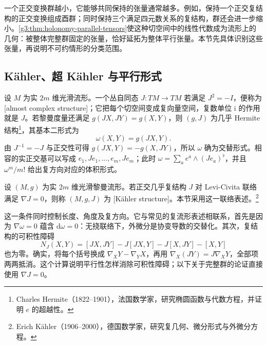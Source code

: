 
% 
% 
% 


一个正交变换群越小，它能够共同保持的张量通常越多。例如，保持一个正交复结构的正交变换组成酉群；同时保持三个满足四元数关系的复结构，群还会进一步缩小。\cref{g3:thm:holonomy-parallel-tensors}使这种切空间中的线性代数成为流形上的几何：被整体完整群固定的张量，恰好延拓为整体平行张量。本节先具体识别这些张量，再说明不可约情形的分类范围。

\subsection{Kähler、超 Kähler 与平行形式}
\label{g3:subsec:0505:01}

设 \(M\) 为实 \(2m\) 维光滑流形。一个丛自同态 \(J:TM\to TM\) 若满足 \(J^2=-I\)，便称为[almost complex structure]；它把每个切空间变成复向量空间，复数单位 \(\mathrm i\) 的作用就是 \(J\)。若黎曼度量还满足 \(g(JX,JY)=g(X,Y)\)，则 \((g,J)\) 为几乎 Hermite 结构\footnote{Charles Hermite（1822--1901），法国数学家，研究椭圆函数与代数方程，并证明 \(e\) 的超越性。}，其基本二形式为
\[
	\omega(X,Y)=g(JX,Y).
\]
由 \(J^{-1}=-J\) 与正交性可得 \(g(JX,Y)=-g(X,JY)\)，所以 \(\omega\) 确为交替形式。相容的实正交基可以写成 \(e_1,Je_1,\ldots,e_m,Je_m\)；此时 \(\omega=\sum_a e^a\wedge(Je_a)^\flat\)，并且 \(\omega^m/m!\) 给出复方向对应的体积形式。

\begin{definition}\label{g3:def:parallel-kahler-structure}
	设 \((M,g)\) 为实 \(2m\) 维光滑黎曼流形。若正交几乎复结构 \(J\) 对 Levi-Civita 联络满足 \(\nabla J=0\)，则称 \((M,g,J)\) 为 [Kähler structure]。本节采用这一联络表述。\footnote{Erich Kähler（1906--2000），德国数学家，研究复几何、微分形式与外微分方程。}
\end{definition}

这一条件同时控制长度、角度及复方向。它与常见的复流形表述相联系，首先是因为 \(\nabla\omega=0\) 蕴含 \(\mathrm d\omega=0\)：无挠联络下，外微分是协变导数的交替化。其次，复结构的可积性障碍
\[
	N_J(X,Y)=[JX,JY]-J[JX,Y]-J[X,JY]-[X,Y]
\]
也为零。确实，将每个括号换成 \(\nabla_XY-\nabla_YX\)，再用 \(\nabla_X(JY)=J\nabla_XY\)，全部项两两抵消。这个计算说明平行性怎样消除可积性障碍；以下关于完整群的论证直接使用 \(\nabla J=0\)。

